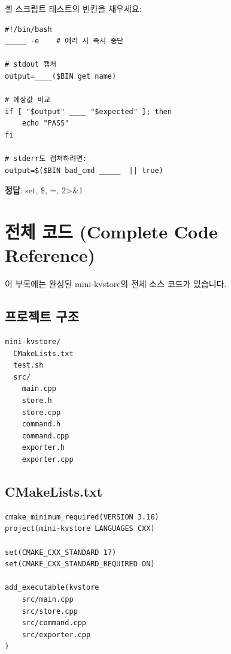 \documentclass[11pt,a4paper]{book}
\newcommand{\file}[1]{\texttt{#1}}
\begin{document}
\begin{quizbox}
셸 스크립트 테스트의 빈칸을 채우세요:

\begin{lstlisting}[style=shell,numbers=none]
#!/bin/bash
_____ -e    # 에러 시 즉시 중단

# stdout 캡처
output=____($BIN get name)

# 예상값 비교
if [ "$output" ____ "$expected" ]; then
    echo "PASS"
fi

# stderr도 캡처하려면:
output=$($BIN bad_cmd _____  || true)
\end{lstlisting}

\textbf{정답}: set, \$, =, 2>\&1
\end{quizbox}

\appendix

\chapter{전체 코드 (Complete Code Reference)}
\label{app:code}

이 부록에는 완성된 mini-kvstore의 전체 소스 코드가 있습니다.

\section{프로젝트 구조}

\begin{lstlisting}[style=shell,numbers=none]
mini-kvstore/
  CMakeLists.txt
  test.sh
  src/
    main.cpp
    store.h
    store.cpp
    command.h
    command.cpp
    exporter.h
    exporter.cpp
\end{lstlisting}

\section{CMakeLists.txt}

\begin{lstlisting}[style=cmake,title={\file{CMakeLists.txt}}]
cmake_minimum_required(VERSION 3.16)
project(mini-kvstore LANGUAGES CXX)

set(CMAKE_CXX_STANDARD 17)
set(CMAKE_CXX_STANDARD_REQUIRED ON)

add_executable(kvstore
    src/main.cpp
    src/store.cpp
    src/command.cpp
    src/exporter.cpp
)
\end{lstlisting}
\end{document}
